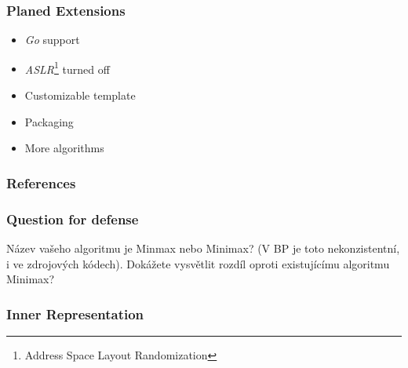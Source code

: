 \documentclass[10pt,xcolor=svgnames,pdflatex]{beamer}
\begin{document}
\begin{frame}\frametitle{Planed Extensions}
  \begin{itemize}
    \item \emph{Go} support
    \item \emph{ASLR}\footnote{Address Space Layout Randomization} turned off
    \item Customizable template
    \item Packaging
    \item More algorithms
  \end{itemize}
\end{frame}

\begin{frame}[allowframebreaks]
	\frametitle{References}
	\printbibliography
\end{frame}


\appendix

\begin{frame}\frametitle{Question for defense}
    Název vašeho algoritmu je Minmax nebo Minimax? (V BP je toto nekonzistentní, i ve zdrojových kódech). Dokážete vysvětlit rozdíl oproti existujícímu algoritmu Minimax?
\end{frame}

\begin{frame}\frametitle{Inner Representation}
  \begin{figure}[h]
  \centering
  \label{fig:tikz:IDStree}
\end{figure}
\end{frame}
\end{document}
